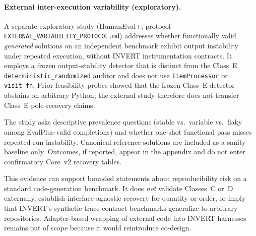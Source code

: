 
\paragraph{External inter-execution variability (exploratory).}
\label{sec:threats:external-variability}

A separate exploratory study (HumanEval+; protocol \texttt{EXTERNAL\_VARIABILITY\_PROTOCOL.md}) addresses whether functionally valid \emph{generated} solutions on an independent benchmark exhibit output instability under repeated execution, without INVERT instrumentation contracts.
It employs a frozen output-stability detector that is distinct from the Class~E \texttt{deterministic\_randomized} auditor and does not use \texttt{ItemProcessor} or \texttt{visit\_fn}.
Prior feasibility probes showed that the frozen Class~E detector abstains on arbitrary Python; the external study therefore does not transfer Class~E pole-recovery claims.

The study asks descriptive prevalence questions (stable vs.\ variable vs.\ flaky among EvalPlus-valid completions) and whether one-shot functional pass misses repeated-run instability.
Canonical reference solutions are included as a sanity baseline only.
Outcomes, if reported, appear in the appendix and do not enter confirmatory Core~v2 recovery tables.

This evidence can support bounded statements about reproducibility risk on a standard code-generation benchmark.
It does \emph{not} validate Classes~C or~D externally, establish interface-agnostic recovery for quantity or order, or imply that INVERT's synthetic trace-contract benchmarks generalize to arbitrary repositories.
Adapter-based wrapping of external code into INVERT harnesses remains out of scope because it would reintroduce co-design.

